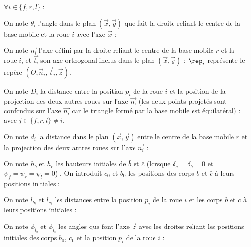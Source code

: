 					
					$\forall i\in\{f,r,l\}$ :
					
					On note $\theta_i$ l'angle dans le plan $(\vec{x}, \vec{y})$ que fait la droite reliant le centre de la base mobile et la roue $i$ avec l'axe $\vec{x}$ :
					
						
					On note  $\vec{n_i}$ l'axe défini par la droite reliant le centre de la base mobile $r$ et la roue $i$, et $\vec{t_i}$ son axe orthogonal inclus dans le plan $(\vec{x}, \vec{y})$ :
					$\rep_i$ représente le repère $(O, \vec{n}_i, \vec{t}_i, \vec{z})$.
					
					On note $D_i$ la distance entre la position $p_i$ de la roue $i$ et la position de la projection des deux autres roues sur l'axe $\vec{n_i}$ 
					(les deux points projetés sont confondus sur l'axe $\vec{n_i}$ car le triangle formé par la base mobile est équilatéral) :
					avec $j\in\{f,r,l\} \neq i$.
					
					On note $d_i$ la distance dans le plan $(\vec{x}, \vec{y})$ entre le centre de la base mobile $r$ et la projection des deux autres roues sur l'axe $\vec{n_i}$ :
					
					
					On note $h_b$ et $h_c$ les hauteurs initiales de $\bar{b}$ et $\bar{c}$ (lorsque $\delta_c=\delta_b=0$ et $\psi_f=\psi_r=\psi_l=0$) .
					On introduit $c_0$ et $b_0$ les positions des corps $\bar{b}$ et $\bar{c}$ à leurs positions initiales :
					
					On note $l_{b_i}$ et $l_{c_i}$ les distances entre la position $p_i$ de la roue $i$ et les corps $\bar{b}$ et $\bar{c}$ à leurs positions initiales :
					
					On note $\phi_{i_b}$ et $\phi_{i_c}$ les angles que font l'axe $\vec{z}$ avec les droites reliant les positions initiales des corps $b_0$, $c_0$ et la position $p_i$ de la roue $i$ :
					
